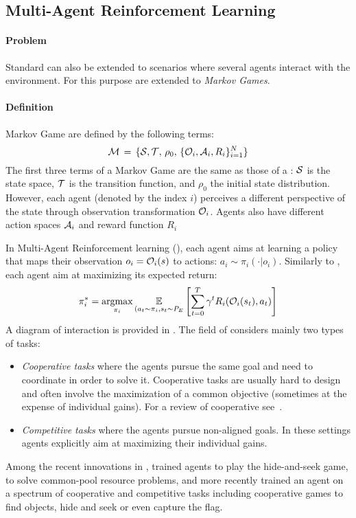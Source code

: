 \subsection{Multi-Agent Reinforcement Learning}
\label{sec:background_marl}
\paragraph{Problem}

Standard \rl can also be extended to scenarios where several agents interact with the environment. For this purpose \mdps are extended to \textit{Markov Games}.
\begin{tcolorbox}
\small
\paragraph{Definition}
\gls{Markov Game} are defined by the following terms:
\begin{equation}
	\mathcal{M}\,=\,\{\mathcal{S},\mathcal{T},\,\rho_0,\,\{\mathcal{O}_i,\mathcal{A}_i,R_i\}_{i=1}^N\}
	\label{eq:markov_game}	
\end{equation}
The first three terms of a Markov Game are the same as those of a \mdp: $\mathcal{S}$ is the state space, $\mathcal{T}$ is the transition function, and $\rho_0$ the initial state distribution. However, each agent (denoted by the index $i$) perceives a different perspective of the state through observation transformation $\mathcal{O}_i$. Agents also have different action spaces $\mathcal{A}_i$ and reward function $R_i$
\end{tcolorbox}

In Multi-Agent Reinforcement learning (\marl), each agent aims at learning a policy that maps their observation $o_i=\mathcal{O}_i(s)$ to actions: $a_i \sim \pi_i(\cdot|o_i)$. Similarly to \rl, each agent aim at maximizing its expected return:
\begin{equation}
	\pi_i^* = \operatorname*{argmax}_{\pi_i} \underset{(a_t\sim\pi_i, s_t \sim P_E}{\mathbb{E}}\left[\sum_{t=0}^T\gamma^tR_i(\mathcal{O}_i(s_t),a_t)\right]
\end{equation}
A diagram of interaction is provided in . The field of \marl considers mainly two types of tasks:
\begin{itemize}[noitemsep]
\item \textit{Cooperative tasks} where the agents pursue the same goal and need to coordinate in order to solve it. Cooperative tasks are usually hard to design and often involve the maximization of a common objective (sometimes at the expense of individual gains). For a review of cooperative \marl see~\citet{OroojlooyJadid2019cooperative}.
\item \textit{Competitive tasks} where the agents pursue non-aligned goals. In these settings agents explicitly aim at maximizing their individual gains. 
\end{itemize}
Among the recent innovations in \marl, \citet{Baker2020Emergent} trained agents to play the hide-and-seek game, \citet{perolat2017commonpool} to solve common-pool resource problems, and more recently \citet{team2021open} trained an agent on a spectrum of cooperative and competitive tasks including cooperative games to find objects, hide and seek or even capture the flag.

